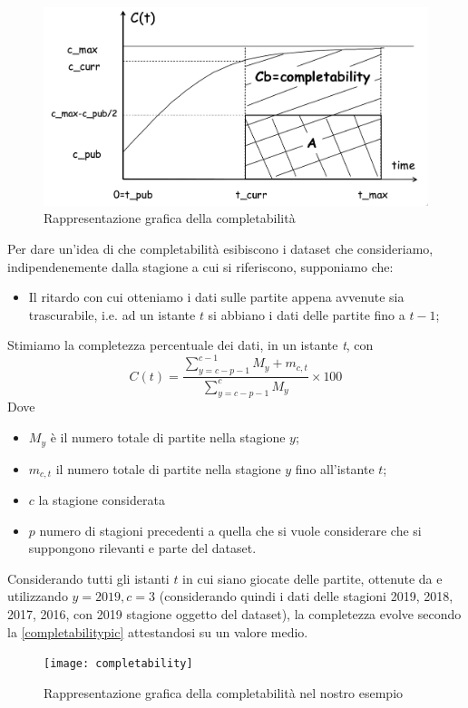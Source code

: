 \begin{figure}
\caption{Rappresentazione grafica della completabilità \cite{batini2006}}
\label{completabilitypic_gen}
\includegraphics[width=\linewidth]{completability_gen.png}
\end{figure}

\par

Per dare un'idea di che completabilità esibiscono i dataset che consideriamo, indipendenemente dalla stagione a cui si riferiscono, supponiamo che:


\begin{itemize}
	\item Il ritardo con cui otteniamo i dati sulle partite appena avvenute sia trascurabile, i.e. ad un istante $t$ si abbiano i dati delle partite fino a $t-1$;
\end{itemize}
	Stimiamo la completezza percentuale dei dati, in un istante \textit{t}, con 
	\begin{equation}
	C(t) = \frac{\sum\limits_{y=c-p-1}^{c-1} M_{y} + m_{c,t}}{\sum\limits_{y=c-p-1}^{c} M_{y}} \times 100
	\end{equation}
	Dove \begin{itemize}
		\item $M_y$ è il numero totale di partite nella stagione $y$;
		\item $m_{c,t}$ il numero totale di partite nella stagione $y$ fino all'istante $t$;
		\item $c$ la stagione considerata
		\item $p$ numero di stagioni precedenti a quella che si vuole considerare che si suppongono rilevanti e parte del dataset.
	\end{itemize}

Considerando tutti gli istanti $t$ in cui siano giocate delle partite, ottenute da \cite{nba_schedule} e utilizzando $y = 2019, c = 3$ (considerando quindi i dati delle stagioni 2019, 2018, 2017, 2016, con 2019 stagione oggetto del dataset), la completezza evolve secondo la \autoref{completabilitypic} attestandosi su un valore medio.

\begin{figure}
\caption{Rappresentazione grafica della completabilità nel nostro esempio}
\label{completabilitypic}
\texttt{[image: completability]}
\end{figure}